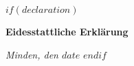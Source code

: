 
$if(declaration)$
\cleardoublepage

\thispagestyle{empty}

\vspace*{\fill}

\textbf{Eidesstattliche Erklärung}


\vspace{20mm}

\noindent\textit{Minden, den $date$}
$endif$
